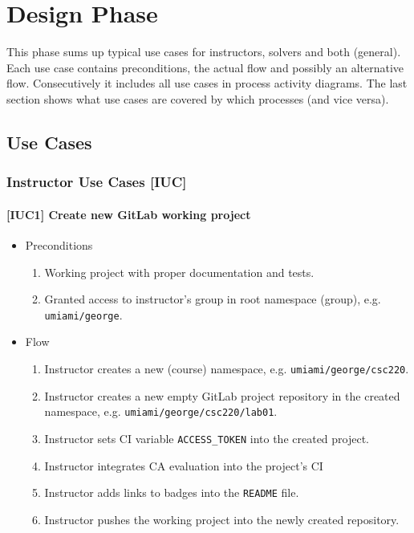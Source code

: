 \chapter{Design Phase} \label{chap:design}

{This phase sums up typical use cases for instructors, solvers and both (general). Each use case contains preconditions, the actual flow and possibly an alternative flow. Consecutively it includes all use cases in process activity diagrams. The last section shows what use cases are covered by which processes (and vice versa).}

\section{Use Cases} \label{sec:uc}

\subsection{{Instructor Use Cases {[}IUC{]}}} \label{ssec:iuc}

\subsubsection{{[}IUC1{]} Create new GitLab working project}

\begin{itemize}
\item
  {Preconditions}
    \begin{enumerate}
    \item 
      {Working project with proper documentation and tests.}
    \item
      {Granted access to instructor's group in root namespace (group), e.g. \texttt{umiami/george}.}
    \end{enumerate}
\end{itemize}

\begin{itemize}
\item
  {Flow}
    \begin{enumerate}
    \item
      {Instructor creates a new (course) namespace, e.g. \texttt{umiami/george/csc220}.}
    \item
      {Instructor creates a new empty GitLab project repository in the created namespace, e.g. \texttt{umiami/george/csc220/lab01}.}
    \item
      {Instructor sets CI variable \texttt{ACCESS\_TOKEN} into the created project.}
    \item
      {Instructor integrates CA evaluation into the project's CI}
    \item
      {Instructor adds links to badges into the \texttt{README} file.}
    \item
      {Instructor pushes the working project into the newly created repository.}
    \end{enumerate}
\end{itemize}


